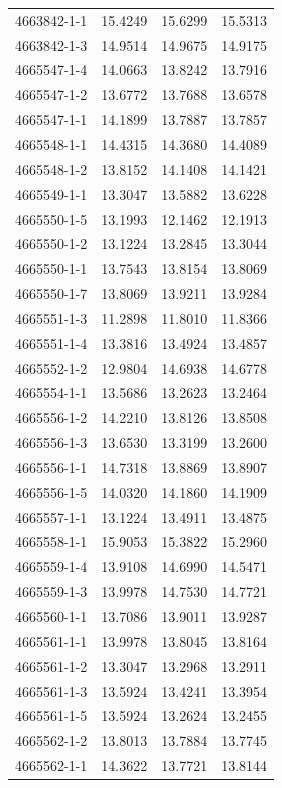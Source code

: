 \begin{longtable}{lrrr}
4663842-1-1 & 15.4249 & 15.6299 & 15.5313 \\
4663842-1-3 & 14.9514 & 14.9675 & 14.9175 \\
4665547-1-4 & 14.0663 & 13.8242 & 13.7916 \\
4665547-1-2 & 13.6772 & 13.7688 & 13.6578 \\
4665547-1-1 & 14.1899 & 13.7887 & 13.7857 \\
4665548-1-1 & 14.4315 & 14.3680 & 14.4089 \\
4665548-1-2 & 13.8152 & 14.1408 & 14.1421 \\
4665549-1-1 & 13.3047 & 13.5882 & 13.6228 \\
4665550-1-5 & 13.1993 & 12.1462 & 12.1913 \\
4665550-1-2 & 13.1224 & 13.2845 & 13.3044 \\
4665550-1-1 & 13.7543 & 13.8154 & 13.8069 \\
4665550-1-7 & 13.8069 & 13.9211 & 13.9284 \\
4665551-1-3 & 11.2898 & 11.8010 & 11.8366 \\
4665551-1-4 & 13.3816 & 13.4924 & 13.4857 \\
4665552-1-2 & 12.9804 & 14.6938 & 14.6778 \\
4665554-1-1 & 13.5686 & 13.2623 & 13.2464 \\
4665556-1-2 & 14.2210 & 13.8126 & 13.8508 \\
4665556-1-3 & 13.6530 & 13.3199 & 13.2600 \\
4665556-1-1 & 14.7318 & 13.8869 & 13.8907 \\
4665556-1-5 & 14.0320 & 14.1860 & 14.1909 \\
4665557-1-1 & 13.1224 & 13.4911 & 13.4875 \\
4665558-1-1 & 15.9053 & 15.3822 & 15.2960 \\
4665559-1-4 & 13.9108 & 14.6990 & 14.5471 \\
4665559-1-3 & 13.9978 & 14.7530 & 14.7721 \\
4665560-1-1 & 13.7086 & 13.9011 & 13.9287 \\
4665561-1-1 & 13.9978 & 13.8045 & 13.8164 \\
4665561-1-2 & 13.3047 & 13.2968 & 13.2911 \\
4665561-1-3 & 13.5924 & 13.4241 & 13.3954 \\
4665561-1-5 & 13.5924 & 13.2624 & 13.2455 \\
4665562-1-2 & 13.8013 & 13.7884 & 13.7745 \\
4665562-1-1 & 14.3622 & 13.7721 & 13.8144 \\

\end{longtable}
